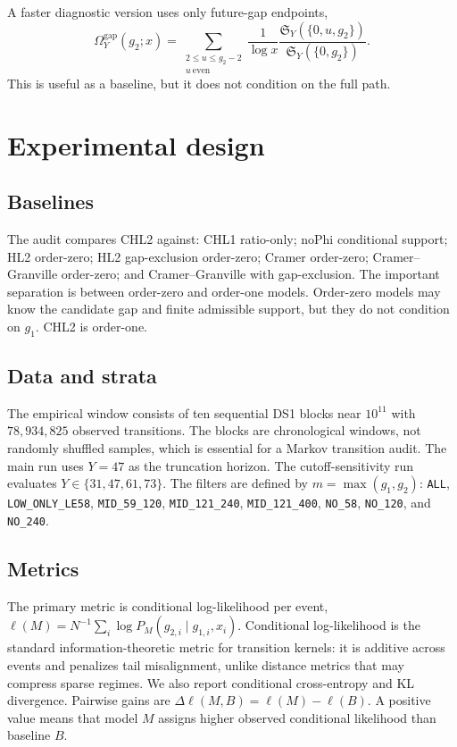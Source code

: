 \documentclass[10pt]{article}
\newcommand{\SY}{\mathfrak{S}_Y}
\newcommand{\loglik}{\ell}
\begin{document}
A faster diagnostic version uses only future-gap endpoints,
\[
\Omega_Y^{\mathrm{gap}}(g_2;x)=\sum_{\substack{2\le u\le g_2-2\\u\ \mathrm{even}}}\frac{1}{\log x}\frac{\SY(\{0,u,g_2\})}{\SY(\{0,g_2\})}.
\]
This is useful as a baseline, but it does not condition on the full path.
\section{Experimental design}
\subsection{Baselines}
The audit compares CHL2 against: CHL1 ratio-only; noPhi conditional support; HL2 order-zero; HL2 gap-exclusion order-zero; Cramer order-zero; Cramer--Granville order-zero; and Cramer--Granville with gap-exclusion. The important separation is between order-zero and order-one models. Order-zero models may know the candidate gap and finite admissible support, but they do not condition on $g_1$. CHL2 is order-one.
\subsection{Data and strata}
The empirical window consists of ten sequential DS1 blocks near $10^{11}$ with $78{,}934{,}825$ observed transitions. The blocks are chronological windows, not randomly shuffled samples, which is essential for a Markov transition audit. The main run uses $Y=47$ as the truncation horizon. The cutoff-sensitivity run evaluates $Y\in\{31,47,61,73\}$. The filters are defined by $m=\max(g_1,g_2)$: \texttt{ALL}, \texttt{LOW\_ONLY\_LE58}, \texttt{MID\_59\_120}, \texttt{MID\_121\_240}, \texttt{MID\_121\_400}, \texttt{NO\_58}, \texttt{NO\_120}, and \texttt{NO\_240}.
\subsection{Metrics}
The primary metric is conditional log-likelihood per event, $\loglik(M)=N^{-1}\sum_i \log P_M(g_{2,i}\mid g_{1,i},x_i)$. Conditional log-likelihood is the standard information-theoretic metric for transition kernels: it is additive across events and penalizes tail misalignment, unlike distance metrics that may compress sparse regimes. We also report conditional cross-entropy and KL divergence. Pairwise gains are $\Delta\loglik(M,B)=\loglik(M)-\loglik(B)$. A positive value means that model $M$ assigns higher observed conditional likelihood than baseline $B$.
\end{document}
